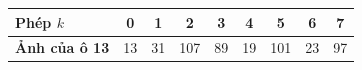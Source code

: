 \begin{tabular}{@{}lcccccccc@{}}
\toprule
\textbf{Phép $k$} & 0 & 1 & 2 & 3 & 4 & 5 & 6 & 7 \\
\midrule
\textbf{Ảnh của ô 13} & 13 & 31 & 107 & 89 & 19 & 101 & 23 & 97 \\
\bottomrule
\end{tabular}
